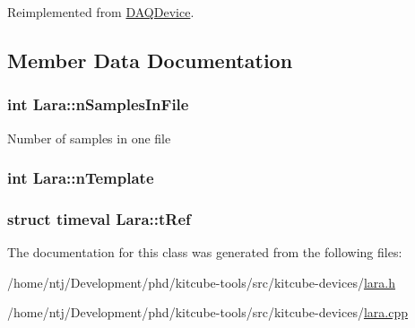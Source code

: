 Reimplemented from \hyperlink{classDAQDevice_acdc9d3765b1dfd845f99ec9c93071811}{D\-A\-Q\-Device}.



\subsection{Member Data Documentation}
\hypertarget{classLara_a6ba4f1300d5a85063428df2e100bc6bf}{
\subsubsection[{n\-Samples\-In\-File}]{\setlength{\rightskip}{0pt plus 5cm}int Lara\-::n\-Samples\-In\-File\hspace{0.3cm}{\ttfamily [private]}}}\label{classLara_a6ba4f1300d5a85063428df2e100bc6bf}
Number of samples in one file \hypertarget{classLara_a5225d610f129a85314440ec529d8b81f}{
\subsubsection[{n\-Template}]{\setlength{\rightskip}{0pt plus 5cm}int Lara\-::n\-Template\hspace{0.3cm}{\ttfamily [private]}}}\label{classLara_a5225d610f129a85314440ec529d8b81f}
\hypertarget{classLara_affcaafa6f994ac7ffc6105fdd0571c01}{
\subsubsection[{t\-Ref}]{\setlength{\rightskip}{0pt plus 5cm}struct timeval Lara\-::t\-Ref\hspace{0.3cm}{\ttfamily [private]}}}\label{classLara_affcaafa6f994ac7ffc6105fdd0571c01}


The documentation for this class was generated from the following files\-:\begin{DoxyCompactItemize}
\item 
/home/ntj/\-Development/phd/kitcube-\/tools/src/kitcube-\/devices/\hyperlink{lara_8h}{lara.\-h}\item 
/home/ntj/\-Development/phd/kitcube-\/tools/src/kitcube-\/devices/\hyperlink{lara_8cpp}{lara.\-cpp}\end{DoxyCompactItemize}
